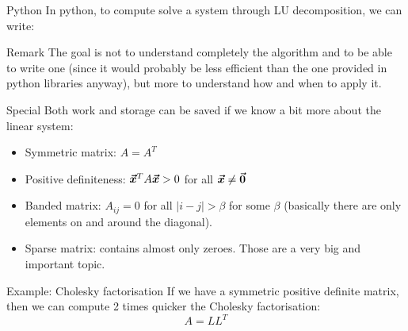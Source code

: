 \documentclass[a4paper]{article}
\begin{document}
\begin{parag}{Python}
    In python, to compute solve a system through LU decomposition, we can write:
\end{parag}

\begin{parag}{Remark}
    The goal is not to understand completely the algorithm and to be able to write one (since it would probably be less efficient than the one provided in python libraries anyway), but more to understand how and when to apply it.
\end{parag}


\begin{parag}{Special}
    Both work and storage can be saved if we know a bit more about the linear system:
    \begin{itemize}
        \item Symmetric matrix: $A = A^T$
        \item Positive definiteness: $\bm{\protect\vec{x}}^T A \bm{\protect\vec{x}} > 0$ for all $\bm{\protect\vec{x}} \neq \bm{\protect\vec{0}}$
        \item Banded matrix: $A_{ij} = 0$ for all $\left|i - j\right| > \beta$ for some $\beta$ (basically there are only elements on and around the diagonal).
        \item Sparse matrix: contains almost only zeroes. Those are a very big and important topic.
    \end{itemize}

    \begin{subparag}{Example: Cholesky factorisation}
        If we have a symmetric positive definite matrix, then we can compute 2 times quicker the Cholesky factorisation: 
        \[A = L L^T\]
    \end{subparag}
    
\end{parag}
\end{document}
